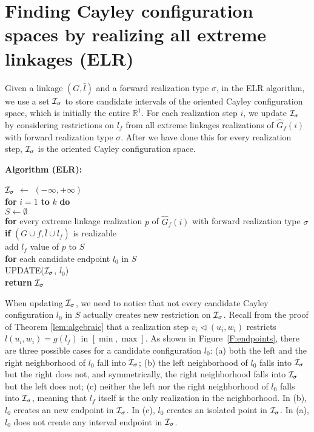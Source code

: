 \documentclass[secthm,amsthm,english]{article}
\theoremstyle{definition}
\theoremstyle{remark}
\begin{document}
\section{Finding Cayley configuration spaces by realizing all extreme linkages (ELR)}
\label{sec:not-low}


Given a linkage $(G, \bar{l})$ and a forward realization type $\sigma$, 
in the ELR algorithm, 
we use a set ${\cal I}_{\sigma}$ to store candidate intervals of the oriented Cayley configuration space, 
which is initially the entire $\mathbb{R}^1$. 
For each realization step $i$, 
we update ${\cal I}_{\sigma}$ by considering restrictions on $l_f$ 
from all extreme linkages realizations of $\hat{G}_f(i)$ with forward realization type $\sigma$. 
After we have done this for every realization step, ${\cal I}_{\sigma}$ is the oriented Cayley configuration space. 


\noindent \textbf{Algorithm (ELR):} 

\indent ${\cal I}_{\sigma}$ $\leftarrow$ $(-\infty, +\infty)$ \\
\indent \textbf{for} $i=1$ \textbf{to} $k$ \textbf{do}
		 \\
	\indent \indent $S \gets \emptyset$
		 \\
	\indent \indent \textbf{for} every extreme linkage realization $p$ of $\hat{G}_f(i)$ with forward realization type $\sigma$\\
		\indent\indent\indent \textbf{if} $(G \cup f, \bar{l}\cup l_f)$ is realizable \\
			\indent\indent\indent\indent add $l_f$ value of $p$ to $S$ \\
	\indent \indent \textbf{for} each candidate endpoint $l_0$ in $S$ \\
	\indent \indent \indent UPDATE(${\cal I}_{\sigma}$, $l_0$) 
				 \\
\indent \textbf{return} ${\cal I}_{\sigma}$

When updating ${\cal I}_{\sigma}$, we need to notice that 
not every candidate Cayley configuration $l_0$ in $S$
actually creates new restriction on ${\cal I}_{\sigma}$.
Recall from the proof of Theorem \ref{lem:algebraic} that
a realization step $v_{i}\triangleleft(u_{i},w_{i})$
restricts $l(u_{i},w_{i})=g(l_f)$ in $[\min,\max]$. 
As shown in Figure~\ref{F:endpoints}, there are three possible cases for a candidate configuration $l_0$: 
(a) both the left and the right neighborhood of $l_0$ fall into ${\cal I}_{\sigma}$; 
(b) the left neighborhood of $l_0$ falls into ${\cal I}_{\sigma}$ but the right does not, and symmetrically,
the right neighborhood falls into ${\cal I}_{\sigma}$ but the left does not;
(c) neither the left nor the right neighborhood of $l_0$ falls into ${\cal I}_{\sigma}$, meaning that $l_f$ itself is the only realization in the neighborhood. 
In (b), $l_0$ creates an new endpoint in ${\cal I}_{\sigma}$. 
In (c), $l_0$ creates an isolated point in ${\cal I}_{\sigma}$. 
In (a), $l_0$ does not create any interval endpoint in ${\cal I}_{\sigma}$. 
\end{document}

